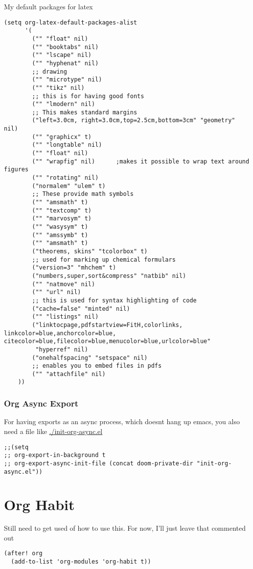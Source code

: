 \documentclass[11pt]{article}
\begin{document}
My default packages for latex
\begin{verbatim}
(setq org-latex-default-packages-alist
      '(
        ("" "float" nil)
        ("" "booktabs" nil)
        ("" "lscape" nil)
        ("" "hyphenat" nil)
        ;; drawing
        ("" "microtype" nil)
        ("" "tikz" nil)
        ;; this is for having good fonts
        ("" "lmodern" nil)
        ;; This makes standard margins
        ("left=3.0cm, right=3.0cm,top=2.5cm,bottom=3cm" "geometry" nil)
        ("" "graphicx" t)
        ("" "longtable" nil)
        ("" "float" nil)
        ("" "wrapfig" nil)      ;makes it possible to wrap text around figures
        ("" "rotating" nil)
        ("normalem" "ulem" t)
        ;; These provide math symbols
        ("" "amsmath" t)
        ("" "textcomp" t)
        ("" "marvosym" t)
        ("" "wasysym" t)
        ("" "amssymb" t)
        ("" "amsmath" t)
        ("theorems, skins" "tcolorbox" t)
        ;; used for marking up chemical formulars
        ("version=3" "mhchem" t)
        ("numbers,super,sort&compress" "natbib" nil)
        ("" "natmove" nil)
        ("" "url" nil)
        ;; this is used for syntax highlighting of code
        ("cache=false" "minted" nil)
        ("" "listings" nil)
        ("linktocpage,pdfstartview=FitH,colorlinks,
linkcolor=blue,anchorcolor=blue,
citecolor=blue,filecolor=blue,menucolor=blue,urlcolor=blue"
         "hyperref" nil)
        ("onehalfspacing" "setspace" nil)
        ;; enables you to embed files in pdfs
        ("" "attachfile" nil)
    ))
\end{verbatim}
\subsubsection{Org Async Export}
\label{sec:org8f4c10d}
For having exports as an async process, which doesnt hang up emacs, you also
need a file like \url{./init-org-async.el}
\begin{verbatim}
;;(setq
;; org-export-in-background t
;; org-export-async-init-file (concat doom-private-dir "init-org-async.el"))
\end{verbatim}

\section{Org Habit}
\label{sec:org41a3e9e}
Still need to get used of how to use this.
For now, I'll just leave that commented out
\begin{verbatim}
(after! org
  (add-to-list 'org-modules 'org-habit t))
\end{verbatim}
\end{document}
